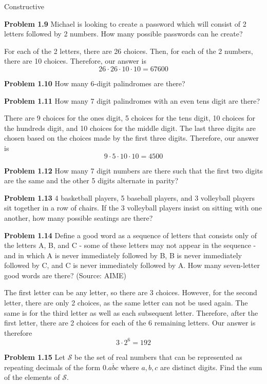 \documentclass[11pt]{scrartcl}
\begin{document}
Constructive 
\begin{tcolorbox}
\textbf{Problem 1.9} Michael is looking to create a password which will consist of 2 letters followed by 2 numbers. How many possible passwords can he create? 
\end{tcolorbox}
\noindent 
For each of the 2 letters, there are 26 choices. Then, for each of the 2 numbers, there are 10 choices. Therefore, our answer is 
$$26 \cdot 26 \cdot 10 \cdot 10=67600$$
\begin{tcolorbox}
\textbf{Problem 1.10} How many 6-digit palindromes are there? 
\end{tcolorbox}
\begin{tcolorbox}
\textbf{Problem 1.11} How many 7 digit palindromes with an even tens digit are there?
\end{tcolorbox}
\noindent 
There are 9 choices for the ones digit, 5 choices for the tens digit, 10 choices for the hundreds digit, and 10 choices for the middle digit. The last three digits are chosen based on the choices made by the first three digits. Therefore, our answer is 
$$9 \cdot 5 \cdot 10 \cdot 10=4500$$
\begin{tcolorbox}
\textbf{Problem 1.12} How many 7 digit numbers are there such that the first two digits are the same and the other 5 digits alternate in parity? 
\end{tcolorbox}
\begin{tcolorbox}
\textbf{Problem 1.13} 4 basketball players, 5 baseball players, and 3 volleyball players sit together in a row of chairs. If the 3 volleyball players insist on sitting with one another, how many possible seatings are there? 
\end{tcolorbox}
\begin{tcolorbox}
\textbf{Problem 1.14} Define a good word as a sequence of letters that consists only of the letters A, B, and
C - some of these letters may not appear in the sequence - and in which A is never immediately followed by B, B
is never immediately followed by C, and C is never immediately followed by A. How many seven-letter good words
are there? (Source: AIME) 
\end{tcolorbox}
\noindent 
The first letter can be any letter, so there are 3 choices. However, for the second letter, there are only 2 choices, as the same letter can not be used again. The same is for the third letter as well as each subsequent letter. Therefore, after the first letter, there are 2 choices for each of the 6 remaining letters. Our answer is therefore 
$$3 \cdot 2^6=192$$
\begin{tcolorbox}
\textbf{Problem 1.15} Let $\mathcal{S}$ be the set of real numbers that can be represented as repeating decimals of the form $0.\overline{abc}$ where $a, b, c$ are distinct digits. Find the sum of the elements of $\mathcal{S}.$ 
\end{tcolorbox}\\
\end{document}
